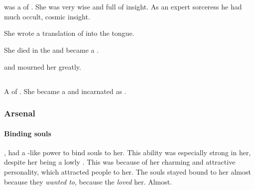 \chapter{\Kezerad}


















\section{\Essenai}
\index{\Essenai}
\Essenai was a \sathariah \resvil of \Kezerad.
She was very wise and full of insight.
As an expert sorceress he had much occult, cosmic insight. 

She wrote a translation of \WanderersInDarknessEmph into the \Resphan tongue.

She died in the  and became a \sephirah.

 and mourned her greatly.


















\section{\Eryal}
\index{\Eryal}
A \thelyad{} \resvil{} of \Kezerad. 
She became a \malach{} and incarnated as . 









\subsection{Arsenal}





\subsubsection{Binding souls}
, \Eryal{} had a \sephirah-like power to bind souls to her. 
This ability was especially strong in her, despite her being a lowly \thelyad. 
This was because of her charming and attractive personality, which attracted people to her. 
The souls stayed bound to her almost because they \emph{wanted to}, because the \emph{loved} her. 
Almost. 

